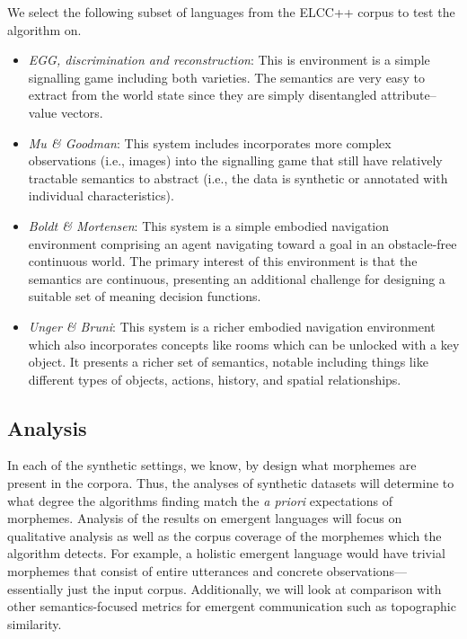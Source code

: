 We select the following subset of languages from the ELCC++ corpus to test the algorithm on.
\begin{itemize}
  \item \emph{EGG, discrimination and reconstruction}:
    This is environment is a simple signalling game including both varieties.
    The semantics are very easy to extract from the world state since they are simply disentangled attribute--value vectors.
    \citep{egg}
  \item \emph{Mu \& Goodman}:
    This system includes incorporates more complex observations (i.e., images) into the signalling game that still have relatively tractable semantics to abstract (i.e., the data is synthetic or annotated with individual characteristics).
    \citep{mu2021generalizations}
  \item \emph{Boldt \& Mortensen}:
    This system is a simple embodied navigation environment comprising an agent navigating toward a goal in an obstacle-free continuous world.
    The primary interest of this environment is that the semantics are continuous, presenting an additional challenge for designing a suitable set of meaning decision functions.
    \citep{boldt2022mathematically}
  \item \emph{Unger \& Bruni}:
    This system is a richer embodied navigation environment which also incorporates concepts like rooms which can be unlocked with a key object.
    It presents a richer set of semantics, notable including things like different types of objects, actions, history, and spatial relationships.
    \citep{unger2020GeneralizingEC}
\end{itemize}


\subsection{Analysis}

In each of the synthetic settings, we know, by design what morphemes are present in the corpora.
Thus, the analyses of synthetic datasets will determine to what degree the algorithms finding match the \emph{a priori} expectations of morphemes.
Analysis of the results on emergent languages will focus on qualitative analysis as well as
  the corpus coverage of the morphemes which the algorithm detects.
For example, a holistic emergent language would have trivial morphemes that consist of entire utterances and concrete observations---essentially just the input corpus.
Additionally, we will look at comparison with other semantics-focused metrics for emergent communication such as topographic similarity.
